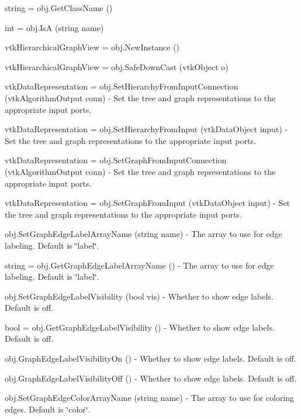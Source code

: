 \begin{DoxyItemize}
\item {\ttfamily string = obj.\-Get\-Class\-Name ()}  
\item {\ttfamily int = obj.\-Is\-A (string name)}  
\item {\ttfamily vtk\-Hierarchical\-Graph\-View = obj.\-New\-Instance ()}  
\item {\ttfamily vtk\-Hierarchical\-Graph\-View = obj.\-Safe\-Down\-Cast (vtk\-Object o)}  
\item {\ttfamily vtk\-Data\-Representation = obj.\-Set\-Hierarchy\-From\-Input\-Connection (vtk\-Algorithm\-Output conn)} -\/ Set the tree and graph representations to the appropriate input ports.  
\item {\ttfamily vtk\-Data\-Representation = obj.\-Set\-Hierarchy\-From\-Input (vtk\-Data\-Object input)} -\/ Set the tree and graph representations to the appropriate input ports.  
\item {\ttfamily vtk\-Data\-Representation = obj.\-Set\-Graph\-From\-Input\-Connection (vtk\-Algorithm\-Output conn)} -\/ Set the tree and graph representations to the appropriate input ports.  
\item {\ttfamily vtk\-Data\-Representation = obj.\-Set\-Graph\-From\-Input (vtk\-Data\-Object input)} -\/ Set the tree and graph representations to the appropriate input ports.  
\item {\ttfamily obj.\-Set\-Graph\-Edge\-Label\-Array\-Name (string name)} -\/ The array to use for edge labeling. Default is \char`\"{}label\char`\"{}.  
\item {\ttfamily string = obj.\-Get\-Graph\-Edge\-Label\-Array\-Name ()} -\/ The array to use for edge labeling. Default is \char`\"{}label\char`\"{}.  
\item {\ttfamily obj.\-Set\-Graph\-Edge\-Label\-Visibility (bool vis)} -\/ Whether to show edge labels. Default is off.  
\item {\ttfamily bool = obj.\-Get\-Graph\-Edge\-Label\-Visibility ()} -\/ Whether to show edge labels. Default is off.  
\item {\ttfamily obj.\-Graph\-Edge\-Label\-Visibility\-On ()} -\/ Whether to show edge labels. Default is off.  
\item {\ttfamily obj.\-Graph\-Edge\-Label\-Visibility\-Off ()} -\/ Whether to show edge labels. Default is off.  
\item {\ttfamily obj.\-Set\-Graph\-Edge\-Color\-Array\-Name (string name)} -\/ The array to use for coloring edges. Default is \char`\"{}color\char`\"{}.  

\end{DoxyItemize}
